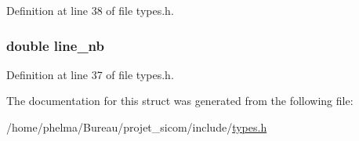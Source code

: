 Definition at line 38 of file types.\-h.

\hypertarget{struct__lexeme___a808a37180ef5a21555b2f0f68cf73cb6}{
\subsubsection[{line\-\_\-nb}]{\setlength{\rightskip}{0pt plus 5cm}double line\-\_\-nb}}\label{struct__lexeme___a808a37180ef5a21555b2f0f68cf73cb6}


Definition at line 37 of file types.\-h.



The documentation for this struct was generated from the following file\-:\begin{DoxyCompactItemize}
\item 
/home/phelma/\-Bureau/projet\-\_\-sicom/include/\hyperlink{types_8h}{types.\-h}\end{DoxyCompactItemize}
